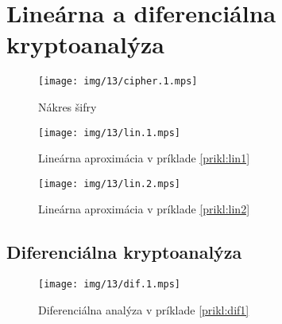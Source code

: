 \section{Lineárna a diferenciálna kryptoanalýza}

\begin{figure}[H]
    \centering
    \texttt{[image: img/13/cipher.1.mps]}
    \caption{Nákres šifry}
\end{figure}



\begin{priklad}
    \label{prikl:lin1}
    \begin{figure}[H]
        \centering
        \texttt{[image: img/13/lin.1.mps]}
        \caption{Lineárna aproximácia v príklade \ref{prikl:lin1}}
    \end{figure}
    
    
\end{priklad}

\begin{priklad}
    \label{prikl:lin2}
    \begin{figure}[H]
        \centering
        \texttt{[image: img/13/lin.2.mps]}
        \caption{Lineárna aproximácia v príklade \ref{prikl:lin2}}
    \end{figure}
    
    
\end{priklad}


\subsection{Diferenciálna kryptoanalýza}



\begin{priklad}
    \label{prikl:dif1}
    \begin{figure}[H]
        \centering
        \texttt{[image: img/13/dif.1.mps]}
        \caption{Diferenciálna analýza v príklade \ref{prikl:dif1}}
    \end{figure}
    
    
\end{priklad}

